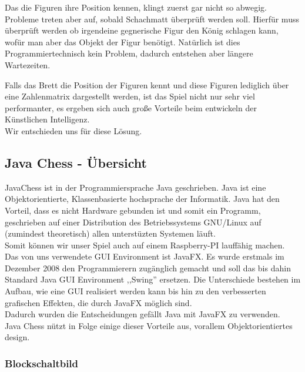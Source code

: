 \documentclass[12pt,a4paper]{article}
\begin{document}
{Das die Figuren ihre Position kennen, klingt zuerst gar nicht so abwegig. Probleme treten aber auf, sobald Schachmatt überprüft werden soll. Hierfür muss überprüft werden ob irgendeine gegnerische Figur den König schlagen kann, wofür man aber das Objekt der Figur benötigt. Natürlich ist dies Programmiertechnisch kein Problem, dadurch entstehen aber längere Wartezeiten. 


Falls das Brett die Position der Figuren kennt und diese Figuren lediglich über eine Zahlenmatrix dargestellt werden, ist das Spiel nicht nur sehr viel performanter, es ergeben sich auch große Vorteile beim entwickeln der Künstlichen Intelligenz. \\ 
Wir entschieden uns für diese Lösung.

\subsection{Java Chess - Übersicht}

JavaChess ist in der Programmiersprache Java geschrieben. Java ist eine Objektorientierte, Klassenbasierte hochsprache der Informatik. Java hat den Vorteil, dass es nicht Hardware gebunden ist und somit ein Programm, geschrieben auf einer Distribution des Betriebssystems GNU/Linux auf (zumindest theoretisch) allen unterstüzten Systemen läuft. \\
Somit können wir unser Spiel auch auf einem Raspberry-PI lauffähig machen. \\
Das von uns verwendete GUI Environment ist JavaFX. Es wurde erstmals im Dezember 2008 den Programmierern zugänglich gemacht und soll das bis dahin Standard Java GUI Environment ,,Swing'' ersetzen. Die Unterschiede bestehen im Aufbau, wie eine GUI realisiert werden kann bis hin zu den verbesserten grafischen Effekten, die durch JavaFX möglich sind. \\

Dadurch wurden die Entscheidungen gefällt Java mit JavaFX zu verwenden.\\
Java Chess nützt in Folge einige dieser Vorteile aus, vorallem Objektorientiertes design. 


\subsubsection{Blockschaltbild}
\label{SUBSUBSEC:BLOCKSCHALTBILD}

}
\end{document}
